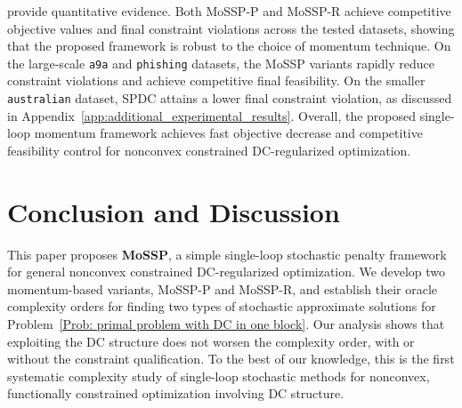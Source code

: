\documentclass{article}
\theoremstyle{plain}
\theoremstyle{definition}
\theoremstyle{remark}
\numberwithin{equation}{section}
\begin{document}
 provide quantitative evidence. Both MoSSP-P and MoSSP-R achieve competitive objective values and final constraint violations across the tested datasets, showing that the proposed framework is robust to the choice of momentum technique. On the large-scale \texttt{a9a} and \texttt{phishing} datasets, the MoSSP variants rapidly reduce constraint violations and achieve competitive final feasibility. On the smaller \texttt{australian} dataset, SPDC attains a lower final constraint violation, as discussed in Appendix~\ref{app:additional_experimental_results}. Overall, the proposed single-loop momentum framework achieves fast 
objective decrease and competitive feasibility control for nonconvex 
constrained DC-regularized optimization.

\section{Conclusion and Discussion}
This paper proposes \textbf{MoSSP}, a simple single-loop stochastic penalty framework for general nonconvex constrained DC-regularized optimization. We develop two momentum-based variants, MoSSP-P and MoSSP-R, and establish their oracle complexity orders for finding two types of stochastic approximate solutions for Problem~\eqref{Prob: primal problem with DC in one block}. Our analysis shows that exploiting the DC structure does not worsen the complexity order, with or without the constraint qualification. To the best of our knowledge, this is the first systematic complexity study of single-loop stochastic methods for nonconvex, functionally constrained optimization involving DC structure.
\end{document}
